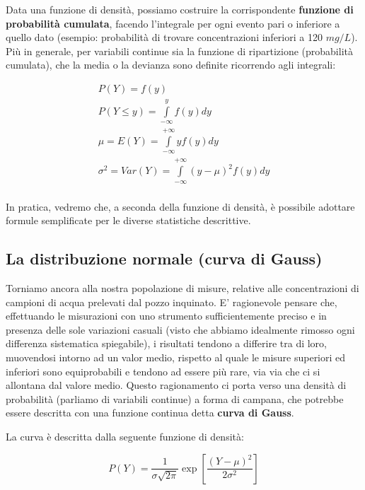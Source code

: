 \documentclass[a4paper,12pt,oneside]{book}
\begin{document}
Data una funzione di densità, possiamo costruire la corrispondente \textbf{funzione di probabilità cumulata}, facendo l'integrale per ogni evento pari o inferiore a quello dato (esempio: probabilità di trovare concentrazioni inferiori a 120 \(mg/L\)). Più in generale, per variabili continue sia la funzione di ripartizione (probabilità cumulata), che la media o la devianza sono definite ricorrendo agli integrali:

\[ \begin{array}{l}
P(Y) = f(y) \\ 
P(Y \leq y) = \int\limits_{ - \infty }^y {f(y)} dy \\ 
\mu  = E(Y) = \int\limits_{ - \infty }^{ + \infty } {yf(y)} dy \\ 
\sigma^2  = Var(Y) = \int\limits_{ - \infty }^{ + \infty } {\left( {y - \mu } \right)^2 f(y)} dy \\ 
\end{array}\]

In pratica, vedremo che, a seconda della funzione di densità, è possibile adottare formule semplificate per le diverse statistiche descrittive.

\hypertarget{la-distribuzione-normale-curva-di-gauss}{%
\subsection{La distribuzione normale (curva di Gauss)}\label{la-distribuzione-normale-curva-di-gauss}}

Torniamo ancora alla nostra popolazione di misure, relative alle concentrazioni di campioni di acqua prelevati dal pozzo inquinato. E' ragionevole pensare che, effettuando le misurazioni con uno strumento sufficientemente preciso e in presenza delle sole variazioni casuali (visto che abbiamo idealmente rimosso ogni differenza sistematica spiegabile), i risultati tendono a differire tra di loro, muovendosi intorno ad un valor medio, rispetto al quale le misure superiori ed inferiori sono equiprobabili e tendono ad essere più rare, via via che ci si allontana dal valore medio. Questo ragionamento ci porta verso una densità di probabilità (parliamo di variabili continue) a forma di campana, che potrebbe essere descritta con una funzione continua detta \textbf{curva di Gauss}.

La curva è descritta dalla seguente funzione di densità:

\[P(Y) = \frac{1}{{\sigma \sqrt {2\pi } }}\exp \left[{\frac{\left( {Y - \mu } \right)^2 }{2\sigma ^2 }} \right]\]
\end{document}
